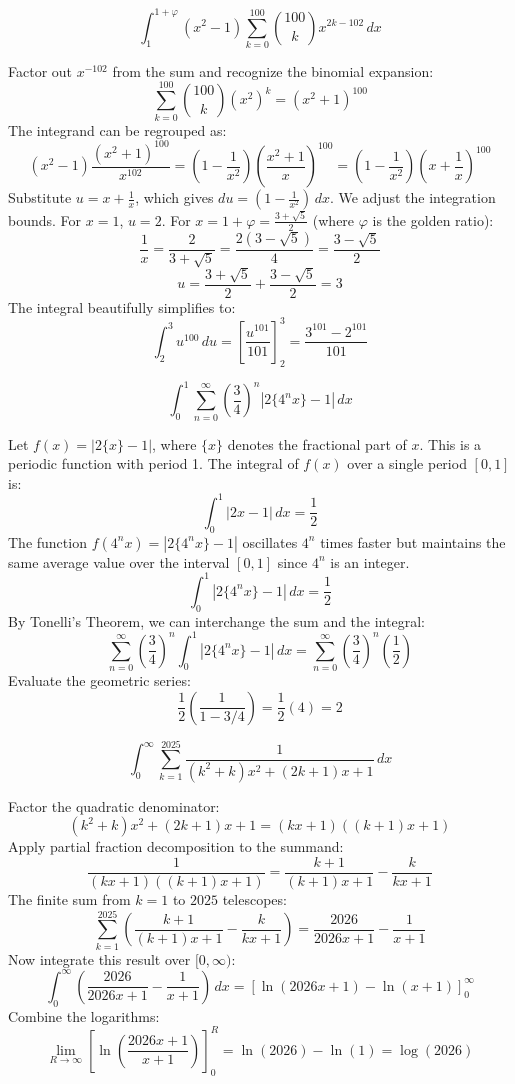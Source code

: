 \begin{questions}
    \question \[ \int_1^{1+\varphi} (x^2 - 1) \sum_{k=0}^{100} \binom{100}{k} x^{2k-102} \,dx \]
    \begin{solution}
        Factor out $x^{-102}$ from the sum and recognize the binomial expansion:
        \[ \sum_{k=0}^{100} \binom{100}{k} (x^2)^k = (x^2 + 1)^{100} \]
        The integrand can be regrouped as:
        \[ (x^2 - 1) \frac{(x^2 + 1)^{100}}{x^{102}} = \left( 1 - \frac{1}{x^2} \right) \left( \frac{x^2 + 1}{x} \right)^{100} = \left( 1 - \frac{1}{x^2} \right) \left( x + \frac{1}{x} \right)^{100} \]
        Substitute $u = x + \frac{1}{x}$, which gives $du = \left( 1 - \frac{1}{x^2} \right) \,dx$. We adjust the integration bounds. For $x = 1$, $u = 2$.
        For $x = 1 + \varphi = \frac{3+\sqrt{5}}{2}$ (where $\varphi$ is the golden ratio):
        \[ \frac{1}{x} = \frac{2}{3+\sqrt{5}} = \frac{2(3-\sqrt{5})}{4} = \frac{3-\sqrt{5}}{2} \]
        \[ u = \frac{3+\sqrt{5}}{2} + \frac{3-\sqrt{5}}{2} = 3 \]
        The integral beautifully simplifies to:
        \[ \int_2^3 u^{100} \,du = \left[ \frac{u^{101}}{101} \right]_2^3 = \frac{3^{101} - 2^{101}}{101} \]
    \end{solution}

    \question \[ \int_0^1 \sum_{n=0}^\infty \left(\frac{3}{4}\right)^n |2\{4^n x\} - 1| \,dx \]
    \begin{solution}
        Let $f(x) = |2\{x\} - 1|$, where $\{x\}$ denotes the fractional part of $x$. This is a periodic function with period 1. The integral of $f(x)$ over a single period $[0, 1]$ is:
        \[ \int_0^1 |2x - 1| \,dx = \frac{1}{2} \]
        The function $f(4^n x) = |2\{4^n x\} - 1|$ oscillates $4^n$ times faster but maintains the same average value over the interval $[0, 1]$ since $4^n$ is an integer.
        \[ \int_0^1 |2\{4^n x\} - 1| \,dx = \frac{1}{2} \]
        By Tonelli's Theorem, we can interchange the sum and the integral:
        \[ \sum_{n=0}^\infty \left(\frac{3}{4}\right)^n \int_0^1 |2\{4^n x\} - 1| \,dx = \sum_{n=0}^\infty \left(\frac{3}{4}\right)^n \left(\frac{1}{2}\right) \]
        Evaluate the geometric series:
        \[ \frac{1}{2} \left( \frac{1}{1 - 3/4} \right) = \frac{1}{2} (4) = 2 \]
    \end{solution}

    \question \[ \int_0^\infty \sum_{k=1}^{2025} \frac{1}{(k^2+k)x^2 + (2k+1)x + 1} \,dx \]
    \begin{solution}
        Factor the quadratic denominator:
        \[ (k^2+k)x^2 + (2k+1)x + 1 = (kx + 1)((k+1)x + 1) \]
        Apply partial fraction decomposition to the summand:
        \[ \frac{1}{(kx + 1)((k+1)x + 1)} = \frac{k+1}{(k+1)x + 1} - \frac{k}{kx + 1} \]
        The finite sum from $k=1$ to $2025$ telescopes:
        \[ \sum_{k=1}^{2025} \left( \frac{k+1}{(k+1)x + 1} - \frac{k}{kx + 1} \right) = \frac{2026}{2026x + 1} - \frac{1}{x + 1} \]
        Now integrate this result over $[0, \infty)$:
        \[ \int_0^\infty \left( \frac{2026}{2026x + 1} - \frac{1}{x + 1} \right) \,dx = \left[ \ln(2026x + 1) - \ln(x + 1) \right]_0^\infty \]
        Combine the logarithms:
        \[ \lim_{R \to \infty} \left[ \ln\left(\frac{2026x + 1}{x + 1}\right) \right]_0^R = \ln(2026) - \ln(1) = \log(2026) \]
    \end{solution}


\end{questions}
